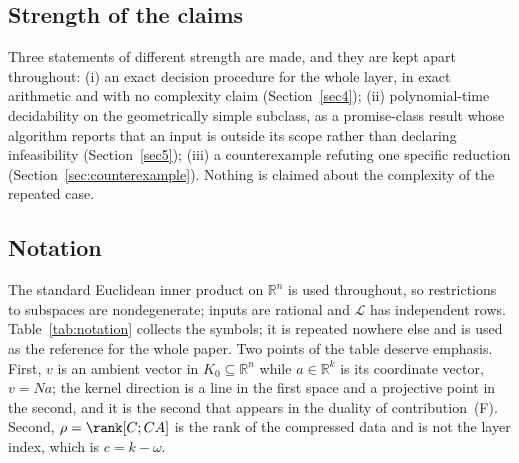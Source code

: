 \subsection{Strength of the claims}\label{sec:intro:claims}

Three statements of different strength are made, and they are kept apart throughout: (i) an exact
decision procedure for the whole layer, in exact arithmetic and with no complexity claim
(Section~\ref{sec4}); (ii) polynomial-time decidability on the geometrically simple subclass, as a
promise-class result whose algorithm reports that an input is outside its scope rather than declaring
infeasibility (Section~\ref{sec5}); (iii) a counterexample refuting one specific reduction
(Section~\ref{sec:counterexample}). Nothing is claimed about the complexity of the repeated case.

\subsection{Notation}\label{sec:intro:notation}

The standard Euclidean inner product on $\mathbb R^n$ is used throughout, so restrictions to subspaces
are nondegenerate; inputs are rational and $\mathcal L$ has independent rows. Table~\ref{tab:notation}
collects the symbols; it is repeated nowhere else and is used as the reference for the whole paper.
Two points of the table deserve emphasis. First, $v$ is an ambient vector in $K_0\subseteq\mathbb R^n$
while $a\in\mathbb R^k$ is its coordinate vector, $v=Na$; the kernel direction is a line in the first
space and a projective point in the second, and it is the second that appears in the duality of
contribution~(F). Second, $\rho=\rank[C;CA]$ is the rank of the compressed data and is not the layer
index, which is $c=k-\omega$.

